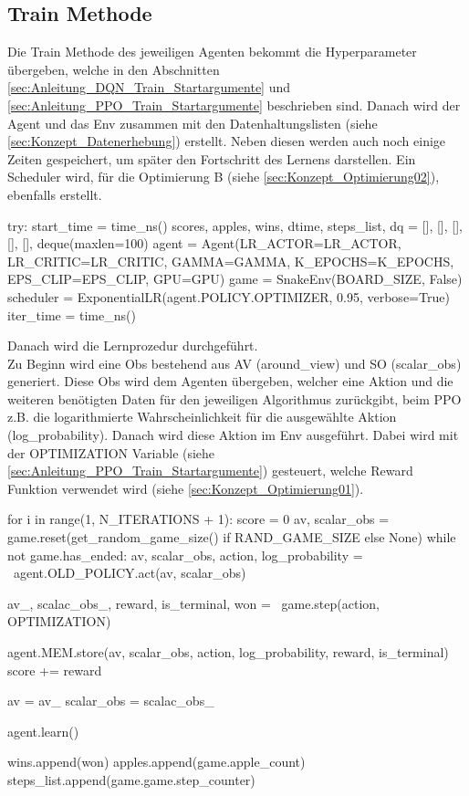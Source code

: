 \subsection{Train Methode}
Die Train Methode des jeweiligen Agenten bekommt die Hyperparameter übergeben, welche in den Abschnitten \ref{sec:Anleitung_DQN_Train_Startargumente} und \ref{sec:Anleitung_PPO_Train_Startargumente} beschrieben sind.
Danach wird der Agent und das Env zusammen mit den Datenhaltungslisten (siehe \ref{sec:Konzept_Datenerhebung}) erstellt. Neben diesen werden auch noch einige Zeiten gespeichert, um später den Fortschritt des Lernens darstellen. Ein Scheduler wird, für die Optimierung B (siehe \ref{sec:Konzept_Optimierung02}), ebenfalls erstellt.
\begin{python}
	try:
		start_time = time_ns()
		scores, apples, wins, dtime, steps_list, dq = [], [], [], [], [], deque(maxlen=100)
		agent = Agent(LR_ACTOR=LR_ACTOR, LR_CRITIC=LR_CRITIC, GAMMA=GAMMA,
		 							K_EPOCHS=K_EPOCHS, EPS_CLIP=EPS_CLIP, GPU=GPU)
		game = SnakeEnv(BOARD_SIZE, False)
		scheduler = ExponentialLR(agent.POLICY.OPTIMIZER, 0.95,
		 				    verbose=True)
		iter_time = time_ns()
\end{python}
Danach wird die Lernprozedur durchgeführt.\\
Zu Beginn wird eine Obs bestehend aus AV (around\_view) und SO (scalar\_obs) generiert. Diese Obs wird dem Agenten übergeben, welcher eine Aktion und die weiteren benötigten Daten für den jeweiligen Algorithmus zurückgibt, beim PPO z.B. die logarithmierte Wahrscheinlichkeit für die ausgewählte Aktion (log\_probability). Danach wird diese Aktion im Env ausgeführt. Dabei wird mit der OPTIMIZATION Variable (siehe \ref{sec:Anleitung_PPO_Train_Startargumente}) gesteuert, welche Reward Funktion verwendet wird (siehe \ref{sec:Konzept_Optimierung01}).
\begin{python}
	for i in range(1, N_ITERATIONS + 1):
		score = 0
		av, scalar_obs = game.reset(get_random_game_size() if RAND_GAME_SIZE else None)
		while not game.has_ended:
			av, scalar_obs, action, log_probability = \
			agent.OLD_POLICY.act(av, scalar_obs)
			
			av_, scalac_obs_, reward, is_terminal, won = \
			game.step(action, OPTIMIZATION)
			
			agent.MEM.store(av, scalar_obs, action, log_probability, reward, 
											is_terminal)
			score += reward
			
			av = av_
			scalar_obs = scalac_obs_
		
		agent.learn()
		
		wins.append(won)
		apples.append(game.apple_count)
		steps_list.append(game.game.step_counter)
\end{python}
